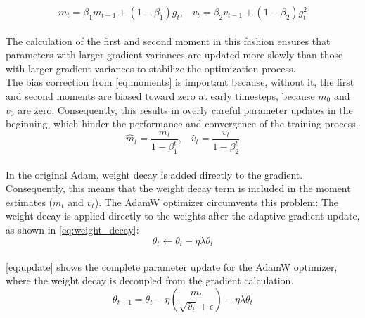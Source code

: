 \documentclass{article}
\begin{document}
\begin{equation}
\label{eq:mean_var}
m_t = \beta_1 m_{t-1} + (1 - \beta_1) g_t \text{,} \quad v_t = \beta_2 v_{t-1} + (1 - \beta_2) g_t^2
\end{equation}
\\
The calculation of the first and second moment in this fashion ensures that parameters with larger gradient variances are updated more slowly than those with larger gradient variances to stabilize the optimization process. \\
The bias correction from \cref{eq:moments} is important because, without it, the first and second moments are biased toward zero at early timesteps, because \(m_0\) and \(v_0\) are zero. Consequently, this results in overly careful parameter updates in the beginning, which hinder the performance and convergence of the training process. \\
\begin{equation}
\hat{m}_t = \frac{m_t}{1 - \beta_1^t} \text{,} \quad \hat{v}_t = \frac{v_t}{1 - \beta_2^t}
\label{eq:moments}
\end{equation}
\\
In the original Adam, weight decay is added directly to the gradient. Consequently, this means that the weight decay term is included in the moment estimates (\(m_t\) and \(v_t\)). The AdamW optimizer circumvents this problem: The weight decay is applied directly to the weights after the adaptive gradient update, as shown in \cref{eq:weight_decay}:
\begin{equation}
\label{eq:weight_decay}
\theta_t \leftarrow \theta_t - \eta \lambda \theta_t
\end{equation}
\\
\cref{eq:update} shows the complete parameter update for the AdamW optimizer, where the weight decay is decoupled from the gradient calculation.
\begin{equation}
\label{eq:update}
\theta_{t+1} = \theta_t - \eta \left( \frac{\hat{m}_t}{\sqrt{\hat{v}_t} + \epsilon} \right) - \eta \lambda \theta_t
\end{equation}

\clearpage


\clearpage



\clearpage

\end{document}
